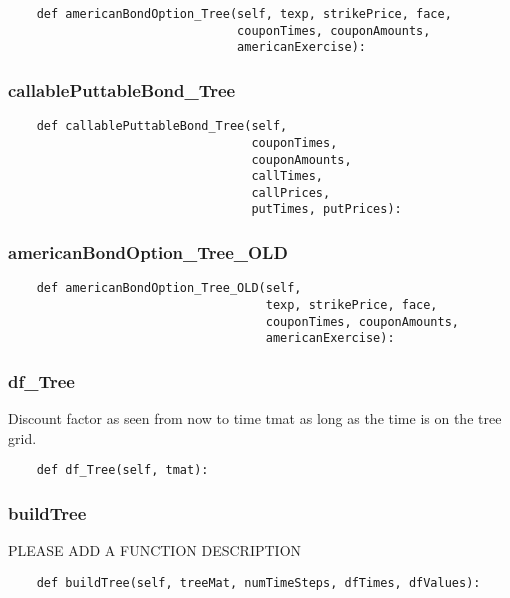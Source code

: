 \documentclass[twoside,11pt]{book}
\begin{document}
\begin{lstlisting}
    def americanBondOption_Tree(self, texp, strikePrice, face,
                                couponTimes, couponAmounts,
                                americanExercise):
\end{lstlisting}

\subsubsection*{{\bf callablePuttableBond\_Tree}}


\begin{lstlisting}
    def callablePuttableBond_Tree(self,
                                  couponTimes,
                                  couponAmounts,
                                  callTimes,
                                  callPrices,
                                  putTimes, putPrices):
\end{lstlisting}

\subsubsection*{{\bf americanBondOption\_Tree\_OLD}}


\begin{lstlisting}
    def americanBondOption_Tree_OLD(self,
                                    texp, strikePrice, face,
                                    couponTimes, couponAmounts,
                                    americanExercise):
\end{lstlisting}

\subsubsection*{{\bf df\_Tree}}
Discount factor as seen from now to time tmat as long as the time is on the tree grid.  

\begin{lstlisting}
    def df_Tree(self, tmat):
\end{lstlisting}

\subsubsection*{{\bf buildTree}}
PLEASE ADD A FUNCTION DESCRIPTION

\begin{lstlisting}
    def buildTree(self, treeMat, numTimeSteps, dfTimes, dfValues):
\end{lstlisting}
\end{document}
